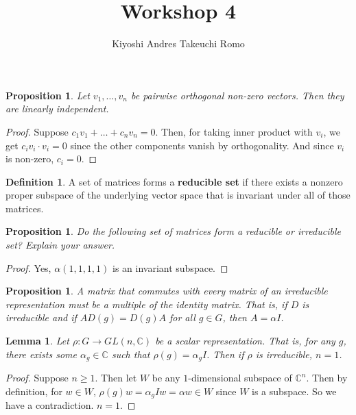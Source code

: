 \documentclass[12pt]{article}
\title{Workshop 4}
\author{Kiyoshi Andres Takeuchi Romo}
\theoremstyle{theorem}
\newtheorem{lemma}[theorem]{Lemma}
\newtheorem{proposition}[theorem]{Proposition}
\theoremstyle{definition}
\newtheorem{definition}{Definition} [section]
\theoremstyle{remark}
\theoremstyle{gremark}
\theoremstyle{discussion}
\theoremstyle{notation}
\begin{document}
	
	\maketitle
	
	
	\begin{proposition}
		Let $v_1,\ldots, v_n$ be pairwise orthogonal non-zero vectors. Then they are linearly independent.
	\end{proposition}

	\begin{proof}
		Suppose $c_1v_1+\ldots+c_nv_n=0$. Then, for taking inner product with $v_i$, we get $c_iv_i\cdot v_i=0$ since the other components vanish by orthogonality. And since $v_i$ is non-zero, $c_i=0$. 
	\end{proof}

	
	
	\pagebreak
	
	

	\begin{definition}
		A set of matrices forms a \textbf{reducible set} if there exists a nonzero proper subspace of the underlying vector space that is invariant under all of those matrices. 
	\end{definition}
		
	\begin{proposition}
		Do the following set of matrices form a reducible or irreducible set? Explain your answer.
	\end{proposition}

	\begin{proof}
		Yes, $\alpha(1,1,1,1)$ is an invariant subspace.
	\end{proof}
		
		
		
		\pagebreak
		
		
	\begin{proposition}
		A matrix that commutes with every matrix of an irreducible representation must be a multiple of the identity matrix. That is, if $D$ is irreducible and if $AD(g) = D(g)A$ for all $g\in G$, then $A = \alpha I$.
	\end{proposition}

	\begin{lemma}
		Let $\rho:G\to GL(n,\mathbb{C})$ be a scalar representation. That is, for any $g$, there exists some $\alpha_g\in \mathbb{C}$ such that $\rho(g)=\alpha_g I$. Then if $\rho$ is irreducible, $n=1$.
	\end{lemma}

	\begin{proof}
		Suppose $n\geq 1$. Then let $W$ be any $1$-dimensional subspace of $\mathbb{C}^n$. Then by definition, for $w\in W$, $\rho(g)w=\alpha_g Iw=\alpha w\in W$ since $W$ is a subspace. So we have a contradiction. $n=1$.
	\end{proof}
\end{document}
